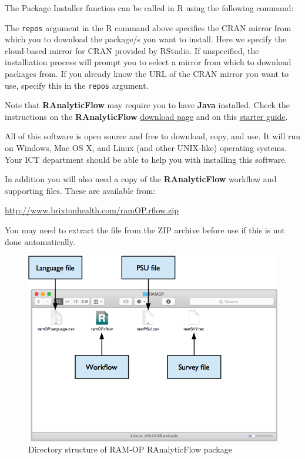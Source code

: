 \documentclass[12pt,]{book}
\theoremstyle{definition}
\theoremstyle{definition}
\theoremstyle{definition}
\theoremstyle{remark}
\begin{document}
The Package Installer function can be called in R using the following
command:

The \texttt{repos} argument in the R command above specifies the CRAN
mirror from which you to download the package/s you want to install.
Here we specify the cloud-based mirror for CRAN provided by RStudio. If
unspecified, the installiation process will prompt you to select a
mirror from which to download packages from. If you already know the URL
of the CRAN mirror you want to use, specify this in the \texttt{repos}
argument.

Note that \textbf{RAnalyticFlow} may require you to have \textbf{Java}
installed. Check the instructions on the \textbf{RAnalyticFlow}
\href{http://r.analyticflow.com/en/download/}{download page} and on this
\href{http://download.ef-prime.com/ranalyticflow/3.1.5/readme.html}{starter
guide}.

All of this software is open source and free to download, copy, and use.
It will run on Windows, Mac OS X, and Linux (and other UNIX-like)
operating systems. Your ICT department should be able to help you with
installing this software.

In addition you will also need a copy of the \textbf{RAnalyticFlow}
workflow and supporting files. These are available from:

\url{http://www.brixtonhealth.com/ramOP.rflow.zip}

You may need to extract the file from the ZIP archive before use if this
is not done automatically.

\begin{figure}[h]

{\centering \includegraphics[width=9.75in]{figures/dirStructureRAF} 

}

\caption{Directory structure of RAM-OP RAnalyticFlow package}\label{fig:raf1}
\end{figure}
\end{document}
